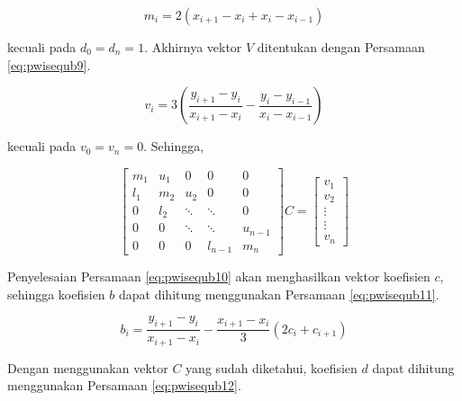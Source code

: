 \documentclass[
]{book}
\theoremstyle{definition}
\theoremstyle{definition}
\theoremstyle{definition}
\theoremstyle{definition}
\theoremstyle{remark}
\begin{document}
\begin{equation}
m_i=2\left(x_{i+1}-x_i+x_i-x_{i-1}\right)
  \label{eq:pwisequb8}
\end{equation}

kecuali pada \(d_0=d_n=1\). Akhirnya vektor \(V\) ditentukan dengan Persamaan \eqref{eq:pwisequb9}.

\begin{equation}
v_i=3\left(\frac{y_{i+1}-y_i}{x_{i+1}-x_i}-\frac{y_i-y_{i-1}}{x_i-x_{i-1}}\right)
  \label{eq:pwisequb9}
\end{equation}

kecuali pada \(v_0=v_n=0\). Sehingga,

\begin{equation}
\begin{bmatrix}
     m_{1} & u_{1} & 0      &     0  & 0             \\[0.3em]
     l_{1} & m_{2} & u_{2}  & 0      & 0             \\[0.3em]
     0     & l_{2} & \ddots & \ddots & 0             \\[0.3em]
     0     & 0     & \ddots & \ddots & u_{n-1}       \\[0.3em]
     0     & 0     & 0      &l_{n-1} & m_{n}
     \end{bmatrix}
C
= \begin{bmatrix}
     v_1                                          \\[0.3em]
     v_2                                          \\[0.3em]
     \vdots                                       \\[0.3em]
     \vdots                                       \\[0.3em]
     v_n                                       
     \end{bmatrix}
  \label{eq:pwisequb10}
\end{equation}

Penyelesaian Persamaan \eqref{eq:pwisequb10} akan menghasilkan vektor koefisien \(c\), sehingga koefisien \(b\) dapat dihitung menggunakan Persamaan \eqref{eq:pwisequb11}.

\begin{equation}
b_i=\frac{y_{i+1}-y_i}{x_{i+1}-x_i}-\frac{x_{i+1}-x_i}{3}\left(2c_i+c_{i+1}\right)
  \label{eq:pwisequb11}
\end{equation}

Dengan menggunakan vektor \(C\) yang sudah diketahui, koefisien \(d\) dapat dihitung menggunakan Persamaan \eqref{eq:pwisequb12}.
\end{document}
